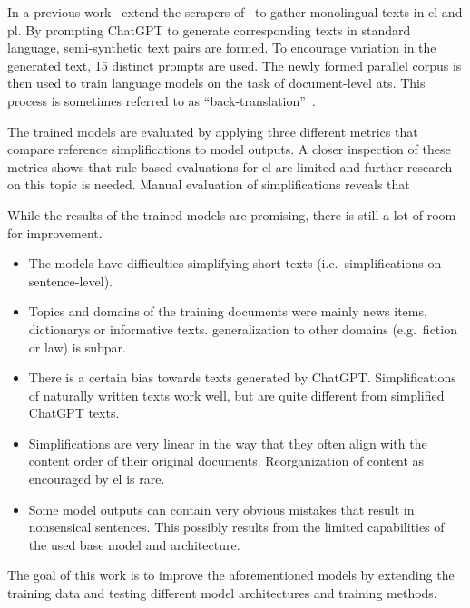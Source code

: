 In a previous work~\textcite{klöser2024german} extend the scrapers of~\textcite{Ansch_tz_2023} to gather monolingual texts in \gls{el} and \gls{pl}.
By prompting ChatGPT to generate corresponding texts in standard language, semi-synthetic text pairs are formed.
To encourage variation in the generated text, 15 distinct prompts are used.
The newly formed parallel corpus is then used to train language models on the task of document-level \gls{ats}.
This process is sometimes referred to as \enquote{back-translation}~\autocite{sennrich-etal-2016-improving}.

The trained models are evaluated by applying three different metrics that compare reference simplifications to model outputs.
A closer inspection of these metrics shows that rule-based evaluations for \gls{el} are limited and further research on this topic is needed.
Manual evaluation of simplifications reveals that

While the results of the trained models are promising, there is still a lot of room for improvement.
\begin{itemize}[noitemsep]
    \item The models have difficulties simplifying short texts (i.e.\ simplifications on sentence-level).
    \item Topics and domains of the training documents were mainly news items, dictionarys or informative texts.
    \gls{generalization} to other domains (e.g.\ fiction or law) is subpar.
    \item There is a certain bias towards texts generated by ChatGPT.
    Simplifications of naturally written texts work well, but are quite different from simplified ChatGPT texts.
    \item Simplifications are very linear in the way that they often align with the content order of their original documents.
    Reorganization of content as encouraged by \gls{el} is rare.
    \item Some model outputs can contain very obvious mistakes that result in nonsensical sentences.
    This possibly results from the limited capabilities of the used base model and architecture.
\end{itemize}

The goal of this work is to improve the aforementioned models by extending the training data and testing different model architectures and training methods.


%
